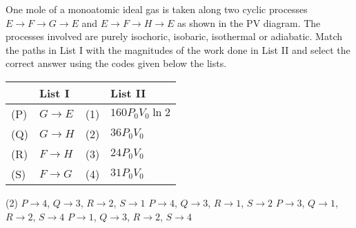 
\item One mole of a monoatomic ideal gas is taken along two cyclic processes $E \rightarrow F \rightarrow G \rightarrow E$ and $E \rightarrow F \rightarrow H \rightarrow E$ as shown in the PV diagram. The processes involved are purely isochoric, isobaric, isothermal or adiabatic. Match the paths in List I with the magnitudes of the work done in List II and select the correct answer using the codes given below the lists.

\begin{center}
    \begin{tikzpicture}
    \end{tikzpicture}
\end{center}

\begin{center}
    \renewcommand{\arraystretch}{2}
    \begin{table}[h]
        \centering
        \begin{tabular}{p{0.25cm}p{8cm}|p{0.25cm}p{5cm}}
        \hline
        & List I & & List II \\
        \hline
        (P)& $G \rightarrow E$ & (1) & $160 P_0 V_0 \ln 2$ \\
        (Q)& $G \rightarrow H$ & (2) & $36 P_0 V_0$ \\
        (R)& $F \rightarrow H$ & (3) & $24 P_0 V_0$ \\
        (S)& $F \rightarrow G$ & (4) & $31 P_0 V_0$ \\
        \hline
        \end{tabular}
    \end{table}
\end{center}

\begin{tasks}(2)
    \task $P \rightarrow 4$, $Q \rightarrow 3$, $R \rightarrow 2$, $S \rightarrow 1$
    \task $P \rightarrow 4$, $Q \rightarrow 3$, $R \rightarrow 1$, $S \rightarrow 2$
    \task $P \rightarrow 3$, $Q \rightarrow 1$, $R \rightarrow 2$, $S \rightarrow 4$
    \task $P \rightarrow 1$, $Q \rightarrow 3$, $R \rightarrow 2$, $S \rightarrow 4$
\end{tasks}
